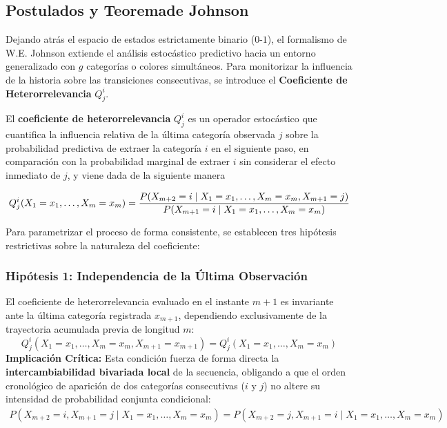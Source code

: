 \subsection{Postulados y Teoremade Johnson}
\noindent
Dejando atrás el espacio de estados estrictamente binario ($0$-$1$), el formalismo de W.E. Johnson extiende el análisis estocástico predictivo hacia un entorno generalizado con $g$ categorías o colores simultáneos. Para monitorizar la influencia de la historia sobre las transiciones consecutivas, se introduce el \textbf{Coeficiente de Heterorrelevancia} $Q_j^i$.

\begin{definicion}
    El \textbf{coeficiente de heterorrelevancia} $Q_j^i$ es un operador estocástico que cuantifica la influencia relativa de la última categoría observada $j$ sobre la probabilidad predictiva de extraer la categoría $i$ en el siguiente paso, en comparación con la probabilidad marginal de extraer $i$ sin considerar el efecto inmediato de $j$, y viene dada de la siguiente manera

    \begin{equation*}
        Q_j^i(X_1 = x_1, \dots, X_m = x_m) = \frac{P(X_{m+2} = i \mid X_1 = x_1, \dots, X_m = x_m, X_{m+1} = j)}{P(X_{m+1} = i \mid X_1 = x_1, \dots, X_m = x_m)} \\
    \end{equation*}
\end{definicion}

\noindent
Para parametrizar el proceso de forma consistente, se establecen tres hipótesis restrictivas sobre la naturaleza del coeficiente:

\subsubsection{Hipótesis 1: Independencia de la Última Observación}
\noindent
El coeficiente de heterorrelevancia evaluado en el instante $m+1$ es invariante ante la última categoría registrada $x_{m+1}$, dependiendo exclusivamente de la trayectoria acumulada previa de longitud $m$:
\begin{equation*}
    Q_j^i(X_1 = x_1, \dots, X_m = x_m, X_{m+1} = x_{m+1}) = Q_j^i(X_1 = x_1, \dots, X_m = x_m)
\end{equation*}
\textbf{Implicación Crítica:} Esta condición fuerza de forma directa la \textbf{intercambiabilidad bivariada local} de la secuencia, obligando a que el orden cronológico de aparición de dos categorías consecutivas ($i$ y $j$) no altere su intensidad de probabilidad conjunta condicional:
\begin{align*}
    P(X_{m+2} = i, X_{m+1} = j \mid X_1 = x_1, \dots, X_m = x_m) = P(X_{m+2} = j, X_{m+1} = i \mid X_1 = x_1, \dots, X_m = x_m)
\end{align*}

